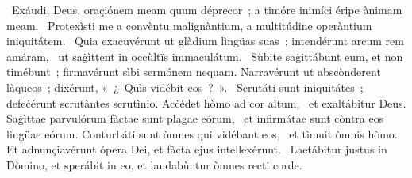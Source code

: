 ~Exáudi, Deus, oraçiónem meam quum déprecor~; a timóre inimíci éripe ànimam meam. 
~Protexìsti me a convèntu malignàntium, a multitúdine operàntium iniquitátem. 
~Quia exacuvérunt ut glàdium lìngüas suas~; intendérunt arcum rem amáram, 
~ut saġìttent in occùltïs immaculátum. 
~Sùbite saġittábunt eum, et non timébunt~; firmavérunt sìbi sermónem nequam. Narravérunt ut abscònderent làqueos~; dixérunt, «~¿~Quìs vidébit eos~?~». 
~Scrutáti sunt iniquitátes~; defeċérunt scrutàntes scrutìnio. Acċédet hòmo ad cor altum, 
~et exaltábitur Deus. Saġìttae parvulórum fàctae sunt plagae eórum, 
~et infirmátae sunt còntra eos lìngüae eórum. Conturbáti sunt òmnes qui vidébant eos, 
~et tìmuit òmnis hòmo. Et adnunçiavérunt ópera Dei, et fàcta ejus intellexérunt. 
~Laetábitur justus in Dòmino, et sperábit in eo, et laudabùntur òmnes recti corde. 
